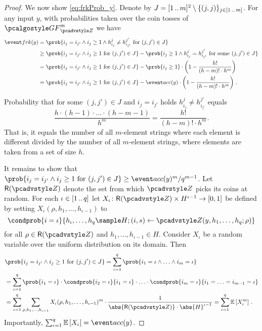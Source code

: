 \begin{proof}
We now show \cref{eq:frkProb_y}.
Denote by $J = [1 \, .. \, m]^2 \setminus \{(j, j)\}_{j \in [1 \, .. \, m]}$. 
For any input $y$, with probabilities taken over the coin tosses of
$\genforking_{\zdv}^{m}$ we have
\begin{align*}
	\frkProb (y) & = \prob{i_j = i_{j'} \land i_j \geq 1 \land
h_{i_j}^{j} \neq h_{i_{j'}}^{j'} \text{ for } (j, j') \in J}	\\
	& \geq \prob{i_j = i_{j'} \land i_j \geq 1 \text{ for } (j, j') \in J} %
   - \prob{i_j \geq 1 \land h_{i_j}^{j} = h_{i_{j'}}^{j'} \text{ for some } (j, j') \in J}\\
	& = \prob{i_j = i_{j'} \land i_j \geq 1 \text{ for } (j, j') \in J} -
	\prob{i_j \geq 1} \cdot 
  \left(1 - \frac{h!}{(h - m)! \cdot h^{m}}\right) \\ 
	& = \prob{i_j = i_{j'} \land
	i_j \geq 1 \text{ for } (j, j') \in J} - \accProb(y) \cdot \left(1 -
\frac{h!}{(h - m)! \cdot h^{m}}\right)\,.
\end{align*}

Probability that for some $(j, j') \in J$ and $i_j = i_{j'}$ holds
$h_{i_j}^{j} \neq h_{i_{j'}}^{j'}$ equals 
\[
  \frac{h \cdot (h - 1)
\cdot \ldots \cdot (h - m - 1)}{h^m} = \frac{h!}{(h - m)! \cdot h^m}.
\]
That is, it equals the number
of all $m$-element strings where each element is different divided by
the number of all $m$-element strings, where elements are taken from a
set of size $h$. 

It remains to show that $\prob{i_j = i_{j'} \land i_j \geq 1 \text{ for } (j,
  j') \in J} \geq \infrac{\accProb(y)^m}{q^{m - 1}}$. Let $\RND{\zdv}$ denote
the set from which $\zdv$ picks its coins at random. For each $\iota \in
[1 \, .. \, q]$ let $X_\iota \colon \RND{\zdv} \times H^{\iota - 1} \to [0, 1]$ be
defined by setting $X_\iota(\rho, h_1, \ldots, h_{\iota - 1})$ to
\[
  \condprob{i = \iota}{h_\iota, \ldots, h_q \sample H; (i, s) \gets \zdv(y, h_1,
    \ldots, h_q; \rho)}
\]
for all $\rho \in \RND{\zdv}$ and $h_1, \ldots, h_{\iota - 1} \in H$. Consider
$X_\iota$ be a random variable over the uniform distribution on its domain. Then
\begin{align*}
	& \prob{i_j = i_{j'} \land i_j \geq 1 \text{ for } (j, j') \in J} 
	 = \sum_{\iota = 1}^{q} \prob{i_1 = \iota \land \ldots \land i_m = \iota} \\
	& = \sum_{\iota = 1}^{q} \prob{i_1 = \iota} \cdot \condprob{i_2 = \iota}{i_1 = \iota} \cdot \ldots \cdot \condprob{i_m = \iota}{i_1 = \ldots = i_{m - 1} = \iota} \\
	& = \sum_{\iota = 1}^{q} \sum_{\rho, h_1, \ldots, h_{\iota - 1}} X_{\iota}
   (\rho, h_1, \ldots, h_{\iota - 1})^{m} \cdot \frac{1}{\abs{\RND{\zdv}} \cdot \abs{H}^{\iota - 1}}
   = \sum_{\iota = 1}^{q} \expected{X_\iota^m} \,.
\end{align*}
Importantly, $\sum_{\iota = 1}^q \expected{X_{\iota}} = \accProb(y)$.


\end{proof}
